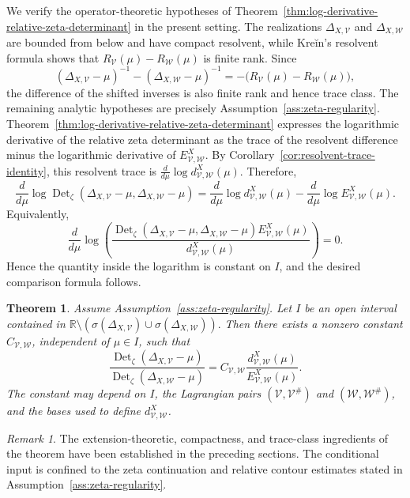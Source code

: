 \documentclass[12pt]{amsart}
\theoremstyle{plain}
\newtheorem{thm}{Theorem}[section]
\theoremstyle{definition}
\theoremstyle{remark}
\newtheorem*{rem}{Remark}
\numberwithin{equation}{section} \numberwithin{figure}{section}
\newcommand{\mb}[1]{\mathbb{#1}} %
\begin{document}
We verify the operator-theoretic hypotheses of
Theorem~\ref{thm:log-derivative-relative-zeta-determinant} in the
present setting. The realizations \(\Delta_{X,\mathcal V}\) and
\(\Delta_{X,\mathcal W}\) are bounded from below and have compact
resolvent, while Kreĭn's resolvent formula shows that
\(R_{\mathcal V}(\mu)-R_{\mathcal W}(\mu)\) is finite rank. Since
\[
(\Delta_{X,\mathcal V}-\mu)^{-1}
-
(\Delta_{X,\mathcal W}-\mu)^{-1}
=
-\bigl(
R_{\mathcal V}(\mu)-R_{\mathcal W}(\mu)
\bigr),
\]
the difference of the shifted inverses is also finite rank and
hence trace class. The remaining analytic hypotheses are precisely
Assumption~\ref{ass:zeta-regularity}.
Theorem~\ref{thm:log-derivative-relative-zeta-determinant} expresses
the logarithmic derivative of the relative zeta determinant as the
trace of the resolvent difference minus the logarithmic derivative
of \(E_{\mathcal V,\mathcal W}^{X}\). By
Corollary~\ref{cor:resolvent-trace-identity}, this resolvent trace is
\(
\frac{d}{d\mu}
\log d_{\mathcal V,\mathcal W}^{X}(\mu).
\)
Therefore,
\[
\frac{d}{d\mu}
\log\operatorname{Det}_{\zeta}
(\Delta_{X,\mathcal V}-\mu,\Delta_{X,\mathcal W}-\mu)
=
\frac{d}{d\mu}
\log d_{\mathcal V,\mathcal W}^{X}(\mu)
-
\frac{d}{d\mu}
\log E_{\mathcal V,\mathcal W}^{X}(\mu).
\]
Equivalently,
\[
\frac{d}{d\mu}
\log\left(
\frac{
\operatorname{Det}_{\zeta}
(\Delta_{X,\mathcal V}-\mu,\Delta_{X,\mathcal W}-\mu)
E_{\mathcal V,\mathcal W}^{X}(\mu)
}{
d_{\mathcal V,\mathcal W}^{X}(\mu)
}
\right)
=
0.
\]
Hence the quantity inside the logarithm is constant on \(I\), and
the desired comparison formula follows.

\begin{thm}\label{thm:shifted-comparison-formula}
Assume Assumption~\ref{ass:zeta-regularity}.
Let \(I\) be an open
interval contained in
\(
\mb R\setminus
(\sigma(\Delta_{X,\mathcal V})
\cup\sigma(\Delta_{X,\mathcal W})).
\)
Then there exists a nonzero constant
\(C_{\mathcal V,\mathcal W}\), independent of \(\mu\in I\), such
that
\[
\frac{
\operatorname{Det}_{\zeta}(\Delta_{X,\mathcal V}-\mu)
}{
\operatorname{Det}_{\zeta}(\Delta_{X,\mathcal W}-\mu)
}
=
C_{\mathcal V,\mathcal W}
\frac{
d_{\mathcal V,\mathcal W}^{X}(\mu)
}{
E_{\mathcal V,\mathcal W}^{X}(\mu)
}.
\]
The constant may depend on \(I\), the Lagrangian pairs
\((\mathcal V,\mathcal V^\#)\) and
\((\mathcal W,\mathcal W^\#)\), and the bases used to define
\(d_{\mathcal V,\mathcal W}^{X}\).
\end{thm}

\begin{rem}
The extension-theoretic, compactness, and trace-class ingredients of
the theorem have been established in the preceding sections. The
conditional input is confined to the zeta continuation and relative
contour estimates stated in Assumption~\ref{ass:zeta-regularity}.
\end{rem}
\end{document}
